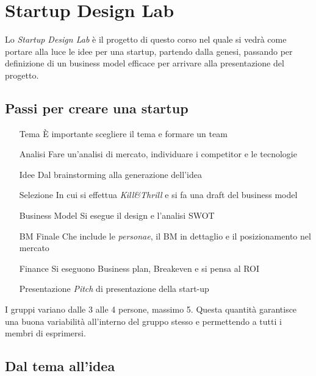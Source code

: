 \chapter{Startup Design Lab}

Lo \emph{Startup Design Lab} è il progetto di questo corso nel quale si vedrà
come portare alla luce le idee per una startup, partendo dalla genesi, passando
per definizione di un business model efficace per arrivare alla presentazione
del progetto.

\section{Passi per creare una startup}

\begin{itemize}
 \item[Tema] È importante scegliere il tema e formare un team
 \item[Analisi] Fare un'analisi di mercato, individuare i competitor e le
tecnologie
 \item[Idee] Dal brainstorming alla generazione dell'idea
 \item[Selezione] In cui si effettua \textit{Kill\&Thrill} e si fa una draft
del business model
 \item[Business Model] Si esegue il design e l'analisi SWOT
 \item[BM Finale] Che include le \textit{personae}, il BM in
dettaglio e il posizionamento nel mercato
 \item[Finance] Si eseguono Business plan, Breakeven e si pensa al ROI
 \item[Presentazione] \textit{Pitch} di presentazione della start-up
\end{itemize}

I gruppi variano dalle 3 alle 4 persone, massimo 5. Questa quantità garantisce
una buona variabilità all'interno del gruppo stesso e permettendo a tutti i
membri di esprimersi.

\section{Dal tema all'idea}

